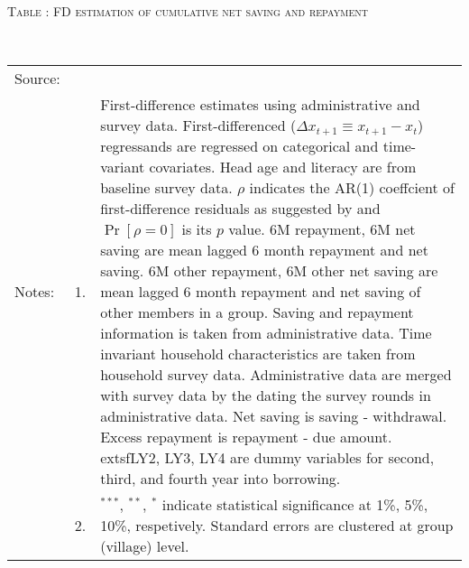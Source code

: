 \hspace{-1cm}\begin{minipage}[t]{14cm}
\hfil\textsc{\normalsize Table \thetable: FD estimation of cumulative net saving and repayment\label{tab FD saving original HH}}\\
\setlength{\tabcolsep}{1pt}
\setlength{\baselineskip}{8pt}
\renewcommand{\arraystretch}{.55}
\hspace{-.75cm}\\
\renewcommand{\arraystretch}{.8}
\setlength{\tabcolsep}{1pt}
\begin{tabular}{>{\hfill\scriptsize}p{1cm}<{}>{\hfill\scriptsize}p{.25cm}<{}>{\scriptsize}p{12cm}<{\hfill}}
Source:& \multicolumn{2}{l}{\scriptsize Estimated with GUK administrative and survey data.}\\
Notes: & 1. & First-difference estimates using administrative and survey data. First-differenced ($\Delta x_{t+1}\equiv x_{t+1} - x_{t}$) regressands are regressed on categorical and time-variant covariates. Head age and literacy are from baseline survey data. $\rho$ indicates the AR(1) coeffcient of first-difference residuals as suggested by \citet[][10.71]{Wooldridge2010} and $\Pr[\rho=0]$ is its $p$ value. \textsf{6M repayment, 6M net saving} are mean lagged 6 month repayment and net saving. \textsf{6M other repayment, 6M other net saving} are mean lagged 6 month repayment and net saving of other members in a group. Saving and repayment information is taken from administrative data. Time invariant household characteristics are taken from household survey data. Administrative data are merged with survey data by the dating the survey rounds in administrative data. Net saving is saving - withdrawal. Excess repayment is repayment - due amount. 	extsf{LY2, LY3, LY4} are dummy variables for second, third, and fourth year into borrowing.\\
& 2. & ${}^{***}$, ${}^{**}$, ${}^{*}$ indicate statistical significance at 1\%, 5\%, 10\%, respetively. Standard errors are clustered at group (village) level.
\end{tabular}
\end{minipage}


